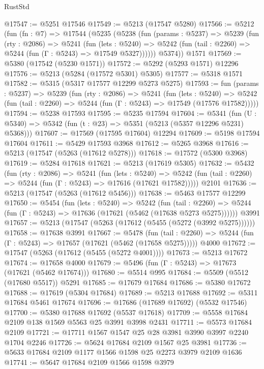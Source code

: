 \begin{lexlean}{RustStd}
\begin{coremodule}
@17547 := @5251 @17546
@17549 := @5213 (@17547 @5280)
@17566 := @5212
    (fun (fn : @7) =>
    @17544
      (@5235
        (@5238
          (fun (params : @5237) =>
          @5239
            (fun (rty : @2086) =>
            @5241
              (fun (lets : @5240) =>
              @5242 (fun (tail : @2260) => @5244 (fun (Γ : @5243) => @17549 @5327))))))
        @5374))
    @1571
@17569 := @5380 (@17542 (@5230 @1571))
@17572 := @5292 (@5293 @1571) @12296
@17576 := @5213 (@5284 (@17572 @5301) @5305)
@17577 := @5318 @1571
@17582 := @5315 (@5317 @17577 @12299 @5273 @5275)
@17593 := fun (params : @5237) =>
  @5239
    (fun (rty : @2086) =>
    @5241
      (fun (lets : @5240) =>
      @5242 (fun (tail : @2260) => @5244 (fun (Γ : @5243) => @17549 (@17576 @17582)))))
@17594 := @5238 @17593
@17595 := @5235 @17594
@17604 := @5341
    (fun (U : @5340) => @5342 (fun (t : @23) => @5351 (@5213 (@5357 @12296 @5231) @5368)))
@17607 := @17569 (@17595 @17604) @12294
@17609 := @5198 @17594 @17604
@17611 := @5429 @17593 @3968
@17612 := @5265 @3968
@17616 := @5213 (@17547 (@5263 (@17612 @5278)))
@17618 := @17572 (@5300 @3968)
@17619 := @5284 @17618
@17621 := @5213 (@17619 @5305)
@17632 := @5432
    (fun (rty : @2086) =>
    @5241
      (fun (lets : @5240) =>
      @5242 (fun (tail : @2260) => @5244 (fun (Γ : @5243) => @17616 (@17621 @17582)))))
    @2101
@17636 := @5213 (@17547 (@5263 (@17612 @5456)))
@17638 := @5463 @17577 @12299
@17650 := @5454
    (fun (lets : @5240) =>
    @5242
      (fun (tail : @2260) =>
      @5244 (fun (Γ : @5243) => @17636 (@17621 (@5462 (@17638 @5273 @5275))))))
    @3991
@17657 := @5213 (@17547 (@5263 (@17612 (@5455 (@5272 (@3992 @5275))))))
@17658 := @17638 @3991
@17667 := @5478
    (fun (tail : @2260) => @5244 (fun (Γ : @5243) => @17657 (@17621 (@5462 (@17658 @5275)))))
    @4000
@17672 := @17547 (@5263 (@17612 (@5455 (@5272 @4001))))
@17673 := @5213 @17672
@17674 := @17658 @4000
@17679 := @5496 (fun (Γ : @5243) => @17673 (@17621 (@5462 @17674)))
@17680 := @5514 @995
@17684 := @5509 (@5512 (@17680 @5517)) @5291
@17685 := @17679 @17684
@17686 := @5380 @17672
@17688 := @17619 (@5304 @17684)
@17689 := @5213 @17688
@17692 := @5311 @17684 @5461 @17674
@17696 := @17686 (@17689 @17692) (@5532 @17546)
@17700 := @5380 @17688 @17692 (@5537 @17618)
@17709 := @5558 @17684 @2109 @138 @1569 @5563 @25 @3991 @3998 @2431
@17711 := @5573 @17684 @2109
@17721 := @17711 @1567 @1547 @25 @28 @3981 @3990 @3997 @2240 @1704 @2246
@17726 := @5624 @17684 @2109 @1567 @25 @3981
@17736 := @5633 @17684 @2109 @1177 @1566 @1598 @25 @2273 @3979 @2109 @1636
@17741 := @5647 @17684 @2109 @1566 @1598 @3979

\end{coremodule}
\end{lexlean}

